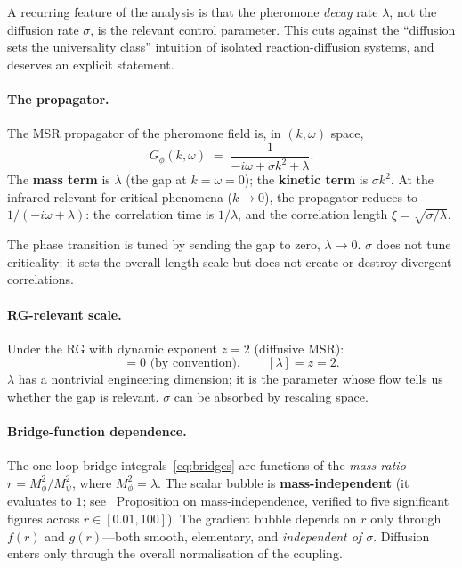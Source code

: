 \documentclass[10pt,a4paper,twocolumn]{article}
\theoremstyle{definition}
\begin{document}
A recurring feature of the analysis is that the pheromone
\emph{decay} rate $\lambda$, not the diffusion rate $\sigma$, is
the relevant control parameter.  This cuts against the
``diffusion sets the universality class'' intuition of isolated
reaction-diffusion systems, and deserves an explicit statement.

\paragraph{The propagator.}
The MSR propagator of the pheromone field is, in $(k,\omega)$ space,
\begin{equation}\label{eq:propagator}
  G_\phi(k,\omega) \;=\; \frac{1}{-i\omega + \sigma k^2 + \lambda}.
\end{equation}
The \textbf{mass term} is $\lambda$ (the gap at
$k=\omega=0$); the \textbf{kinetic term} is $\sigma k^2$.  At
the infrared relevant for critical phenomena ($k\to 0$), the
propagator reduces to $1/(-i\omega+\lambda)$: the correlation
time is $1/\lambda$, and the correlation length
$\xi = \sqrt{\sigma/\lambda}$.

The phase transition is tuned by sending the gap to zero,
$\lambda \to 0$.  $\sigma$ does not tune criticality: it sets
the overall length scale but does not create or destroy
divergent correlations.

\paragraph{RG-relevant scale.}
Under the RG with dynamic exponent $z=2$ (diffusive MSR):
\begin{equation}
  [\sigma] = 0 \text{ (by convention)},
  \qquad
  [\lambda] = z = 2.
\end{equation}
$\lambda$ has a nontrivial engineering dimension; it is the
parameter whose flow tells us whether the gap is relevant.
$\sigma$ can be absorbed by rescaling space.

\paragraph{Bridge-function dependence.}
The one-loop bridge integrals~\eqref{eq:bridges} are functions
of the \emph{mass ratio} $r = M_\phi^2/M_\psi^2$, where
$M_\phi^2 = \lambda$.  The scalar bubble is
\textbf{mass-independent} (it evaluates to $1$;
see~\citep{Amarteifio2026cfac} Proposition on mass-independence,
verified to five significant figures across $r \in [0.01, 100]$).
The gradient bubble depends on $r$ only through $f(r)$ and
$g(r)$---both smooth, elementary, and \emph{independent of
$\sigma$}.  Diffusion enters only through the overall
normalisation of the coupling.
\end{document}
